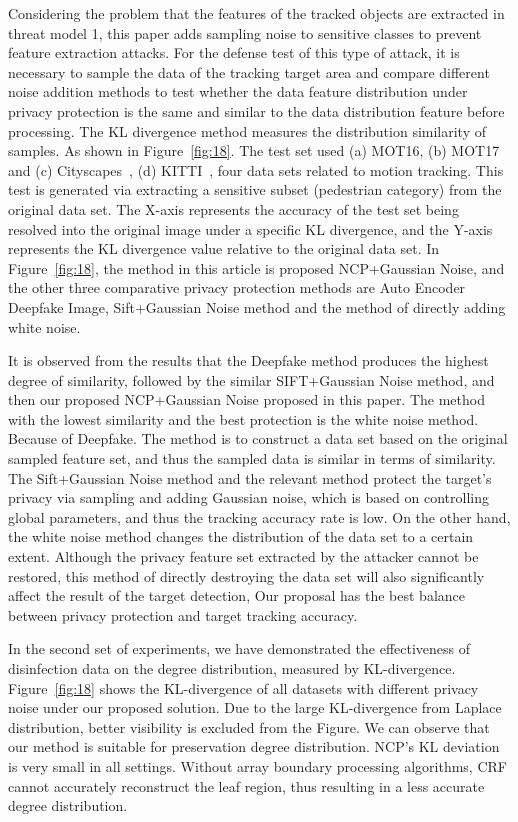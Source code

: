 \documentclass[trans]{IEEEtran}
\newcommand{\el}[1]{{\color{black}#1}}
\begin{document}
\el{ Considering} the problem that the features of the tracked objects are extracted in threat model 1, this paper adds sampling noise to sensitive classes to prevent feature extraction attacks. For the defense test of this type of attack, it is necessary to sample the data of the tracking target area and compare different noise addition methods to test whether the data feature distribution under privacy protection is the same and similar to the data distribution feature before processing. The KL divergence method measures the distribution similarity of samples. As shown in Figure~\ref{fig:18}. The test set used (a) MOT16, (b) MOT17~\cite{milan2016mot16} and (c) Cityscapes~\cite{cordts2016cityscapes}, (d) KITTI~\cite{geiger2013vision}, four data sets related to motion tracking. This test is generated \el{ via} extracting a sensitive subset (pedestrian category) from the original data set. The X-axis represents the accuracy of the test set being resolved into the original image under a specific KL divergence, and the Y-axis represents the KL divergence value relative to the original data set. In Figure~\ref{fig:18}, the method in this article is \el{ proposed} NCP+Gaussian Noise, and the other three comparative privacy protection methods are Auto Encoder Deepfake Image, Sift+Gaussian Noise method and the method of directly adding white noise.

It is observed from the results that the Deepfake method produces the highest degree of similarity, followed by the similar SIFT+Gaussian Noise method, and then  \el{our} proposed NCP+Gaussian Noise proposed in this paper. The method with the lowest similarity and the best protection is the white noise method. Because of Deepfake. The method is to construct a data set based on the original sampled feature set,  \el{and thus the sampled data is similar in terms of similarity. The Sift+Gaussian Noise method and the relevant method protect the target's privacy via sampling and adding Gaussian noise, which is based on controlling global parameters, and thus the tracking accuracy rate is low. On the other hand, the white noise method changes the distribution of the data set to a certain extent. Although the privacy feature set extracted by the attacker cannot be restored, this method of directly destroying the data set will also significantly affect the result of the target detection, Our proposal has the best balance between privacy protection and target tracking accuracy.}

In the second set of experiments, we \el{ have} demonstrated the effectiveness of disinfection data on the degree distribution, measured by KL-divergence. Figure~\ref{fig:18} shows the KL-divergence of all datasets with different privacy noise under our proposed solution. Due to the large KL-divergence from Laplace distribution, better visibility is excluded from the Figure. We can observe that our method is suitable for preservation degree distribution. NCP's KL deviation is very small in all settings. Without array boundary processing algorithms, CRF cannot accurately reconstruct the leaf region, thus resulting in a less accurate degree distribution.
	
\end{document}
